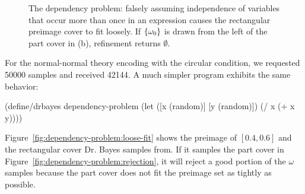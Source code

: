 \begin{figure}[tb!]
{}%
\tab%
%
\caption[The dependency problem]{The dependency problem: falsely assuming independence of variables that occur more than once in an expression causes the rectangular preimage cover to fit loosely.
If $\{{\omega_0}\}$ is drawn from the left of the part cover in (b), refinement returns $\emptyset$.}
\label{fig:dependency-problem}
\end{figure}

For the normal-normal theory encoding with the circular condition, we requested 50000 samples and received 42144.
A much simpler program exhibits the same behavior:
\begin{center}\singlespacing
\begin{schemedisplay}
(define/drbayes dependency-problem
  (let ([x  (random)]
        [y  (random)])
    (/ x (+ x y))))
\end{schemedisplay}
\end{center}
Figure~\ref{fig:dependency-problem:loose-fit} shows the preimage of $[0.4,0.6]$ and the rectangular cover Dr. Bayes samples from.
If it samples the part cover in Figure~\ref{fig:dependency-problem:rejection}, it will reject a good portion of the $\omega$ samples because the part cover does not fit the preimage set as tightly as possible.


